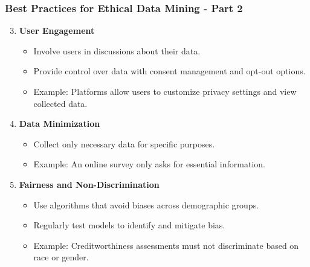 \documentclass[aspectratio=169]{beamer}
\begin{document}
\begin{frame}[fragile]
    \frametitle{Best Practices for Ethical Data Mining - Part 2}
    \begin{enumerate}
        \setcounter{enumi}{2}
        \item \textbf{User Engagement}
            \begin{itemize}
                \item Involve users in discussions about their data.
                \item Provide control over data with consent management and opt-out options.
                \item Example: Platforms allow users to customize privacy settings and view collected data.
            \end{itemize}

        \item \textbf{Data Minimization}
            \begin{itemize}
                \item Collect only necessary data for specific purposes.
                \item Example: An online survey only asks for essential information.
            \end{itemize}
        
        \item \textbf{Fairness and Non-Discrimination}
            \begin{itemize}
                \item Use algorithms that avoid biases across demographic groups.
                \item Regularly test models to identify and mitigate bias.
                \item Example: Creditworthiness assessments must not discriminate based on race or gender.
            \end{itemize}
    \end{enumerate}
\end{frame}
\end{document}

